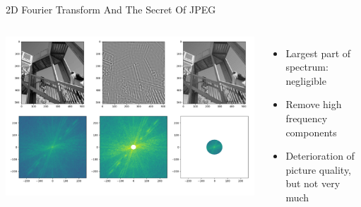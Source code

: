 
\begin{frame}{2D Fourier Transform And The Secret Of JPEG}
%
\begin{columns}[T]
\includegraphics[width=\linewidth]{./gfx/05-FFT-2D}
%
\begin{itemize}
\item Largest part of spectrum: negligible
\item Remove high frequency components 
\item[\Thus] Deterioration of picture quality, but not very much
\end{itemize}
\end{columns}
%
\end{frame}


